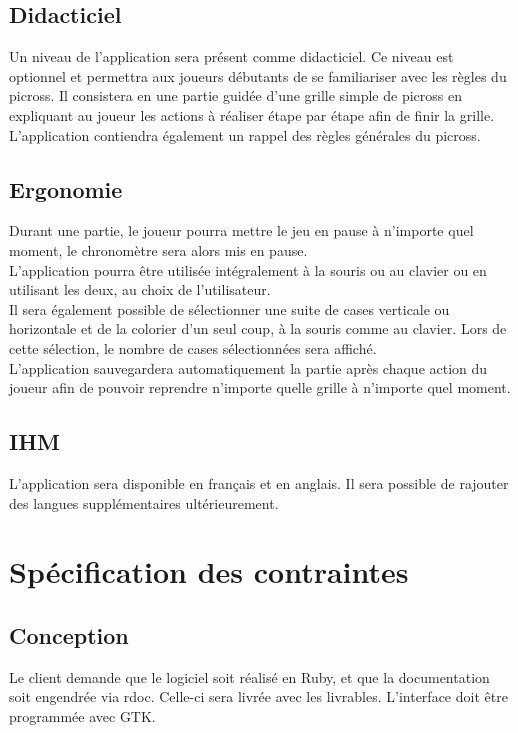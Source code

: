 \documentclass{report}
\begin{document}
		\section{Didacticiel}
			Un niveau de l'application sera présent comme didacticiel. Ce niveau est optionnel et permettra aux joueurs débutants de se familiariser avec les règles du picross. Il consistera en une partie guidée d'une grille simple de picross en expliquant au joueur les actions à réaliser étape par étape afin de finir la grille. L'application contiendra également un rappel des règles générales du picross.

		\section{Ergonomie}
			Durant une partie, le joueur pourra mettre le jeu en pause à n'importe quel moment, le chronomètre sera alors mis en pause.\\
     		L'application pourra être utilisée intégralement à la souris ou au clavier ou en utilisant les deux, au choix de l'utilisateur.\\
			Il sera également possible de sélectionner une suite de cases verticale ou horizontale et de la colorier d'un seul coup, à la souris comme au clavier. Lors de cette sélection, le nombre de cases sélectionnées sera affiché.\\
			L'application sauvegardera automatiquement la partie après chaque action du joueur afin de pouvoir reprendre n'importe quelle grille à n'importe quel moment.

			
		\section{IHM}
			L'application sera disponible en français et en anglais. Il sera possible de rajouter des langues supplémentaires ultérieurement.
			
\chapter{Spécification des contraintes}

	\section{Conception}
		Le client demande que le logiciel soit réalisé en Ruby, et que la documentation soit engendrée via rdoc. Celle-ci sera livrée avec les livrables. L'interface doit être programmée avec GTK.
		
\end{document}
